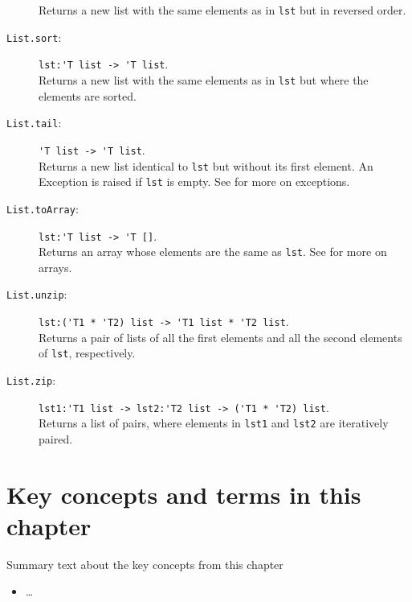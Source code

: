 \documentclass[fsharpNotes.tex]{subfiles}
\begin{document}
\begin{description}
  Returns a new list with the same elements as in \lstinline{lst} but in reversed order.
\item[\texttt{List.sort}:] \lstinline{lst:'T list -> 'T list}.~\\
  Returns a new list with the same elements as in \lstinline{lst} but where the elements are sorted.
\item[\texttt{List.tail}:]  \lstinline{'T list -> 'T list}.~\\
  Returns a new list identical to \lstinline{lst} but without its first element. An Exception is raised if \lstinline{lst} is empty.  See  for more on exceptions.
\item[\texttt{List.toArray}:] \lstinline{lst:'T list -> 'T []}.~\\
  Returns an array whose elements are the same as \lstinline{lst}.  See  for more on arrays.
\item[\texttt{List.unzip}:] \lstinline{lst:('T1 * 'T2) list -> 'T1 list * 'T2 list}.~\\
  Returns a pair of lists of all the first elements and all the second elements of \lstinline{lst}, respectively.
\item[\texttt{List.zip}:] \lstinline{lst1:'T1 list -> lst2:'T2 list -> ('T1 * 'T2) list}.~\\
  Returns a list of pairs, where elements in \lstinline{lst1} and \lstinline{lst2} are iteratively paired.
\end{description}

\section{Key concepts and terms in this chapter}
Summary text about the key concepts from this chapter
\begin{itemize}
\item \ldots
\end{itemize}
\end{document}
